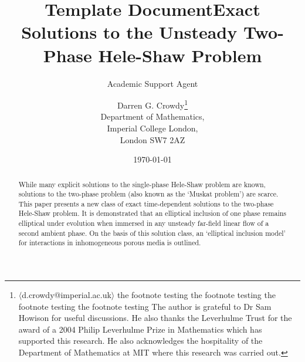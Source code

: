 \documentclass{article}
\title{Template Document}
\author{Academic Support Agent}
\date{\today}
\begin{document}
\maketitle

\title{Exact Solutions to the Unsteady Two-Phase Hele-Shaw Problem}

\author{Darren G. Crowdy\setcounter{footnote}{1}\thanks{$\langle${d.crowdy@imperial.ac.uk}$\rangle$
 the footnote testing the footnote testing  the footnote testing the footnote testing\newline
\hspace*{10.5pt}The author is grateful to Dr Sam Howison for useful discussions. He also
thanks the Leverhulme Trust for the award of a 2004 Philip Leverhulme Prize
in Mathematics which has supported this research. He also acknowledges the
hospitality of the Department of Mathematics at MIT where this research was carried out.
}\\
Department of Mathematics,\\ Imperial College London,\\ London  SW7 2AZ}

\maketitle


\pagestyle{headings}
\begin{abstract} 
{While many explicit solutions to the single-phase Hele-Shaw problem 
are known, solutions to the two-phase problem (also known as the `Muskat
problem') are scarce. This paper presents a new class of exact time-dependent
solutions to the two-phase  Hele-Shaw problem. It is demonstrated that an
elliptical inclusion of one phase remains elliptical under evolution when
immersed in any unsteady far-field linear flow of a second ambient phase.
On the basis of this solution class, an `elliptical inclusion model'  for
interactions in inhomogeneous porous media is outlined.}
{ }
\end{abstract}
\end{document}
